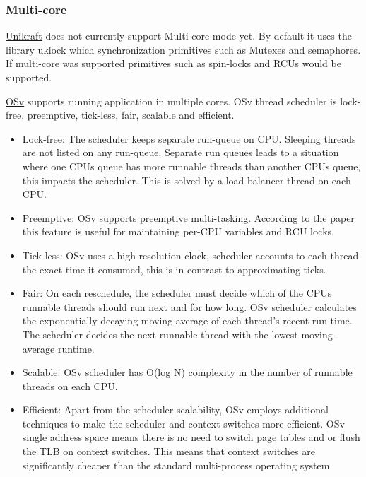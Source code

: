 \subsubsection{Multi-core}
\underline{Unikraft} does not currently support Multi-core mode yet. By default it uses the library
uklock which synchronization primitives such as Mutexes and semaphores. If multi-core 
was supported primitives such as spin-locks and RCUs would be supported. 
\hfill \break

\underline{OSv} supports running application in multiple cores. OSv thread scheduler is lock-free, 
preemptive, tick-less, fair, scalable and efficient. 
\begin{itemize}
  \item Lock-free: The scheduler keeps separate run-queue on CPU. Sleeping threads 
  are not listed on any run-queue. Separate run queues leads to a situation where 
  one CPUs queue has more runnable threads than another CPUs queue, this impacts 
  the scheduler. This is solved by a load balancer thread on each CPU. 
  \item Preemptive: OSv supports preemptive multi-tasking. According to the 
  paper\cite{OSv} this feature is useful for maintaining per-CPU variables and 
  RCU locks. 
  \item Tick-less: OSv uses a high resolution clock, scheduler accounts to each thread 
  the exact time it consumed, this is in-contrast to approximating ticks. 
  \item Fair: On each reschedule, the scheduler must decide which of the CPUs runnable 
  threads should run next and for how long. OSv scheduler calculates the exponentially-decaying 
  moving average of each thread's recent run time. The scheduler decides the next runnable 
  thread with the lowest moving-average runtime.
  \item Scalable: OSv scheduler has O(log N) complexity in the number of runnable threads on 
  each CPU.
  \item Efficient: Apart from the scheduler scalability, OSv employs additional techniques to 
  make the scheduler and context switches more efficient. OSv single address space 
  means there is no need to switch page tables and or flush the TLB on context switches. 
  This means that context switches are significantly cheaper than the standard 
  multi-process operating system.
\end{itemize}
\hfill \break

